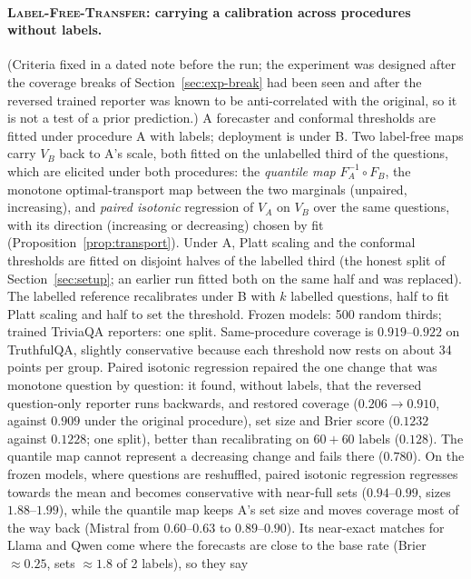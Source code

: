 \documentclass[twoside]{article}
\theoremstyle{definition}
\theoremstyle{remark}
\newcommand{\1}{\mathbf{1}}
\newcommand{\expname}[1]{\textsc{#1}}
\begin{document}
\paragraph{\expname{Label-Free-Transfer}: carrying a calibration across procedures without labels.} (Criteria fixed in a
dated note before the run; the experiment was designed after the coverage breaks of
Section~\ref{sec:exp-break} had been seen and after the reversed trained reporter was known to be
anti-correlated with the original, so it is not a test of a prior prediction.) A forecaster and
conformal thresholds are fitted under procedure A with labels; deployment is under B. Two label-free
maps carry $V_B$ back to A's scale, both fitted on the unlabelled third of the questions, which are
elicited under both procedures: the \emph{quantile map} $F_A^{-1}\circ F_B$, the monotone
optimal-transport map between the two marginals (unpaired, increasing), and \emph{paired isotonic}
regression of $V_A$ on $V_B$ over the same questions, with its direction (increasing or decreasing)
chosen by fit (Proposition~\ref{prop:transport}). Under A, Platt scaling and the conformal thresholds are fitted on disjoint halves of the labelled third
(the honest split of Section~\ref{sec:setup}; an earlier run fitted both on the same half and was
replaced). The labelled reference recalibrates under B with $k$ labelled questions, half to fit Platt
scaling and half to set the threshold. Frozen models: 500 random thirds; trained TriviaQA reporters: one
split. Same-procedure coverage is $0.919$--$0.922$ on TruthfulQA, slightly conservative because each
threshold now rests on about 34 points per group.
Paired isotonic regression repaired the one change that was monotone question by question: it found,
without labels, that the reversed question-only reporter runs backwards, and restored coverage ($0.206\to
0.910$, against $0.909$ under the original procedure), set size and Brier score ($0.1232$ against $0.1228$;
one split), better than recalibrating on $60{+}60$ labels ($0.128$). The quantile map cannot represent a
decreasing change and fails there ($0.780$). On the frozen models, where questions are reshuffled, paired
isotonic regression regresses towards the mean and becomes conservative with near-full sets ($0.94$--$0.99$,
sizes $1.88$--$1.99$), while the quantile map keeps A's set size and moves coverage most of the way back
(Mistral from $0.60$--$0.63$ to $0.89$--$0.90$). Its near-exact matches for Llama and Qwen come where the
forecasts are close to the base rate (Brier $\approx0.25$, sets $\approx1.8$ of 2 labels), so they say
\end{document}
